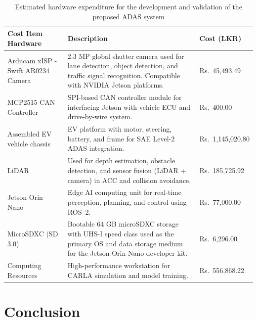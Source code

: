 \documentclass[12pt, a4paper]{report}
\begin{document}
\begin{table}[h]
\centering
\caption{Estimated hardware expenditure for the development and validation of the proposed ADAS system}
\label{tab:hardware_cost}
\renewcommand{\arraystretch}{1.3}
\begin{tabular}{|p{4cm}|p{7cm}|p{3cm}|}
\hline
\textbf{Cost Item Hardware} & \textbf{Description} & \textbf{Cost (LKR)} \\ \hline

Arducam xISP - Swift AR0234 Camera &
2.3 MP global shutter camera used for lane detection, object detection, and traffic signal recognition. Compatible with NVIDIA Jetson platforms. &
Rs.\ 45,493.49 \\ \hline

MCP2515 CAN Controller &
SPI-based CAN controller module for interfacing Jetson with vehicle ECU and drive-by-wire system. &
Rs.\ 400.00 \\ \hline

Assembled EV vehicle chassis &
EV platform with motor, steering, battery, and frame for SAE Level-2 ADAS integration. &
Rs.\ 1,145,020.80 \\ \hline

LiDAR &
Used for depth estimation, obstacle detection, and sensor fusion (LiDAR + camera) in ACC and collision avoidance. &
Rs.\ 185,725.92 \\ \hline

Jetson Orin Nano &
Edge AI computing unit for real-time perception, planning, and control using ROS~2. &
Rs.\ 77,000.00 \\ \hline

MicroSDXC (SD 3.0) &
Bootable 64 GB microSDXC storage with UHS-I speed class used as the primary OS and data storage medium for the Jetson Orin Nano developer kit. &
Rs.\ 6,296.00 \\ \hline

Computing Resources &
High-performance workstation for CARLA simulation and model training. &
Rs.\ 556,868.22 \\ \hline

\end{tabular}
\end{table}


\chapter{Conclusion}
\end{document}

